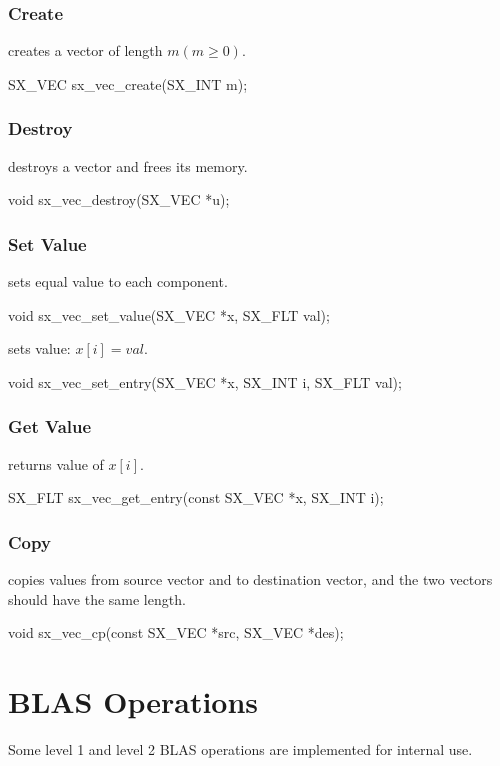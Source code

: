 \subsubsection{Create}
 creates a vector of length $m (m \ge 0)$.
\begin{evb}
SX_VEC sx_vec_create(SX_INT m);
\end{evb}

\subsubsection{Destroy}

 destroys a vector and frees its memory.
\begin{evb}
void sx_vec_destroy(SX_VEC *u);
\end{evb}

\subsubsection{Set Value}

 sets equal value to each component.
\begin{evb}
void sx_vec_set_value(SX_VEC *x, SX_FLT val);
\end{evb}

 sets value: $x[i] = val$.
\begin{evb}
void sx_vec_set_entry(SX_VEC *x, SX_INT i, SX_FLT val);
\end{evb}

\subsubsection{Get Value}
 returns value of $x[i]$.
\begin{evb}
SX_FLT sx_vec_get_entry(const SX_VEC *x, SX_INT i);
\end{evb}

\subsubsection{Copy}
 copies values from source vector and to destination vector, and the two vectors
should have the same length.
\begin{evb}
void sx_vec_cp(const SX_VEC *src, SX_VEC *des);
\end{evb}

\section{BLAS Operations}
Some level 1 and level 2 BLAS operations are implemented for internal use.

